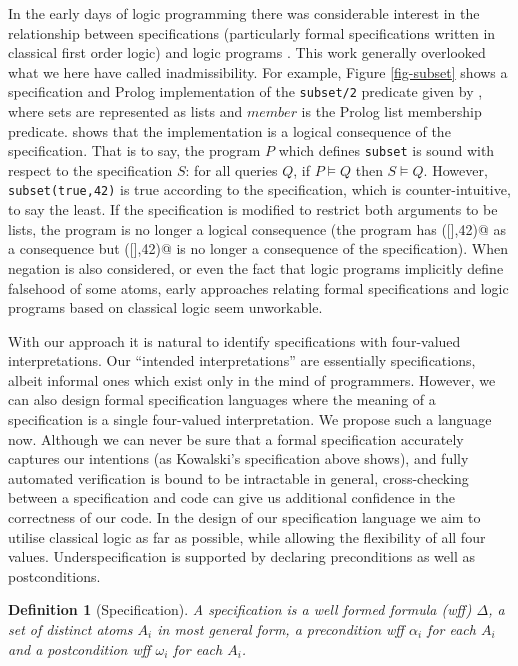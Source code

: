 \documentclass{tlp}
\newtheorem{definition}{Definition}
\begin{document}
In the early days of logic programming there was considerable interest
in the relationship between specifications (particularly formal
specifications written in classical first order logic) and logic programs
\cite{ClarkSickel,Hog81,SatoTamaki,Kow85}.
This work generally overlooked what we here have called inadmissibility.  
For example, Figure \ref{fig-subset}
shows a specification and Prolog implementation of the \texttt{subset/2}
predicate given by , where sets are represented as lists and
$member$ is the Prolog list membership predicate.   shows
that the implementation is a logical consequence of the specification.
That is to say, the program $P$ which defines \verb!subset!
is sound with respect to the specification $S$:
for all queries $Q$, if $P \models Q$ then $S \models Q$.
However, \texttt{subset(true,42)} is true according to the specification,
which is counter-intuitive, to say the least.  If the specification
is modified to restrict both arguments to be lists, the program is no
longer a logical consequence (the program has \verb@subset([],42)@ as
a consequence but \verb@subset([],42)@ is no longer a consequence of
the specification).  
When negation is also considered, or even the fact that logic programs 
implicitly define falsehood of some atoms, early approaches relating
formal specifications and logic programs based on classical logic seem 
unworkable.  

With our approach it is natural to identify specifications with
four-valued interpretations.  Our ``intended interpretations'' are
essentially specifications, albeit informal ones which exist only in the
mind of programmers.  However, we can also design formal specification
languages where the meaning of a specification is a single four-valued
interpretation.  We propose such a language now.  Although we can never be
sure that a formal specification accurately captures our intentions
(as Kowalski's specification above shows), and fully automated
verification is bound to be intractable in general,
cross-checking between a specification and code can give us
additional confidence in
the correctness of our code.  In the design of our specification language
we aim to utilise classical logic as far as possible, while allowing
the flexibility of all four values.  Underspecification is supported by
declaring preconditions as well as postconditions.

\begin{definition}[Specification]
A specification is a well formed formula (wff) $\Delta$, a set of distinct
atoms $A_i$ in most general form, a precondition wff $\alpha_i$ for each
$A_i$ and a postcondition wff $\omega_i$ for each $A_i$.
\end{definition}
\end{document}
